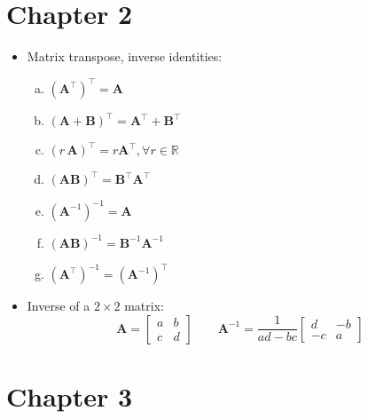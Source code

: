 \documentclass[11pt]{article}
\newcommand{\Thm}{\fbox{Thm}}
\newcommand{\R}{\mathbb{R}}
\newcommand{\A}{\mathbf{A}}
\begin{document}
\newpage

\section{Chapter 2}

\begin{itemize}

\item[\Thm] Matrix transpose, inverse identities:
 \begin{enumerate} [a)]
   \item $(\A^\intercal)^\intercal = \A$
   \item $(\A + \mathbf{B})^\intercal = \A^\intercal + \mathbf{B}^\intercal$
   \item $(r \, \A)^\intercal = r\A^\intercal, \forall r \in \R$
   \item $(\A \mathbf{B})^\intercal = \mathbf{B}^\intercal \A^\intercal$
   \item $(\A^{-1})^{-1} = \A$
   \item $(\A \mathbf{B})^{-1} = \mathbf{B}^{-1} \A^{-1}$
   \item $(\A^\intercal)^{-1} = (\A^{-1})^\intercal$
 \end{enumerate}
 
\item[\Thm] Inverse of a $2 \times 2$ matrix:
$$
\A = 
\begin{bmatrix}
    a & b \\
    c & d 
\end{bmatrix}
\qquad
\A^{-1} = 
\frac{1}{ad-bc}
\begin{bmatrix}
    d & -b \\
    -c & a 
\end{bmatrix}
$$
\end{itemize}

\newpage

\section{Chapter 3}
\end{document}

